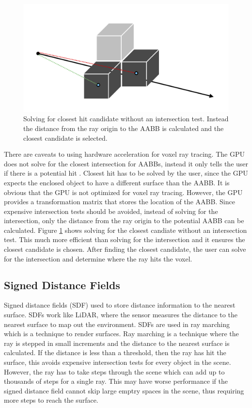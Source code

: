 \documentclass[12pt]{article}
\begin{document}
\begin{figure}[h]
    \begin{center}
        \includegraphics[scale=0.22]{ClosestHit-Approx}
    \end{center}
    \caption{
        Solving for closest hit candidate without an intersection test.
        Instead the distance from the ray origin to the AABB is calculated and the closest candidate is selected.}
    \label{fig:ClosestHit-Approx}
\end{figure}

There are caveats to using hardware acceleration for voxel ray tracing.
The GPU does not solve for the closest intersection for AABBs, instead it only tells the user if there is a potential hit \parencite{DirectX:Specification}.
Closest hit has to be solved by the user, since the GPU expects the enclosed object to have a different surface than the AABB.
It is obvious that the GPU is not optimized for voxel ray tracing.
However, the GPU provides a transformation matrix that stores the location of the AABB.
Since expensive intersection tests should be avoided, instead of solving for the intersection, only the distance from the ray origin to the potential AABB can be calculated.
Figure \ref{fig:ClosestHit-Approx} shows solving for the closest candiate without an intersection test.
This much more efficient than solving for the intersection and it ensures the closest candidate is chosen.
After finding the closest candidate, the user can solve for the intersection and determine where the ray hits the voxel.


\subsection{Signed Distance Fields}

Signed distance fields (SDF) used to store distance information to the nearest surface. 
SDFs work like LiDAR, where the sensor measures the distance to the nearest surface to map out the environment.
SDFs are used in ray marching which is a technique to render surfaces. 
Ray marching is a technique where the ray is stepped in small increments and the distance to the nearest surface is calculated.
If the distance is less than a threshold, then the ray has hit the surface, this avoids expensive intersection tests for every object in the scene.
However, the ray has to take steps through the scene which can add up to thousands of steps for a single ray.
This may have worse performance if the signed distance field cannot skip large emptry spaces in the scene, thus
requiring more steps to reach the surface.
\end{document}
